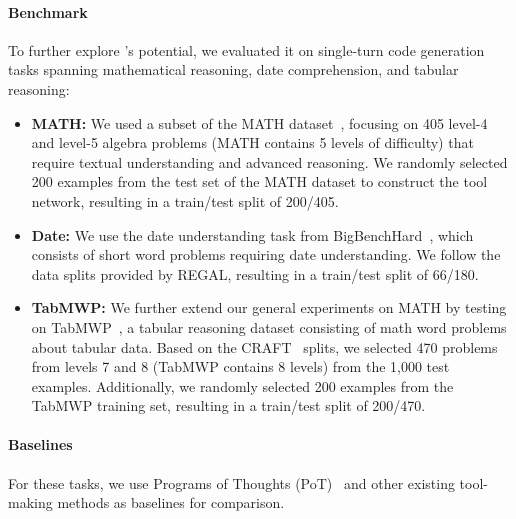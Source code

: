 \paragraph{Benchmark}
To further explore {\ours}'s potential, we evaluated it on single-turn code generation tasks spanning mathematical reasoning, date comprehension, and tabular reasoning:
 \begin{itemize}
     \item \textbf{MATH:} We used a subset of the MATH dataset~\citep{hendrycks2021measuring}, focusing on 405 level-4 and level-5 algebra problems (MATH contains 5 levels of difficulty) that require textual understanding and advanced reasoning. We randomly selected 200 examples from the test set of the MATH dataset to construct the tool network, resulting in a train/test split of 200/405.
     \item \textbf{Date:} We use the date understanding task from BigBenchHard~\citep{srivastava2022beyond}, which consists of short word problems requiring date understanding. We follow the data splits provided by REGAL\citep{stengel2024regal}, resulting in a train/test split of 66/180.
     \item \textbf{TabMWP:} We further extend our general experiments on MATH by testing on TabMWP~\citep{grand2023learning}, a tabular reasoning dataset consisting of math word problems about tabular data. Based on the CRAFT~\citep{yuan2023craft} splits, we selected 470 problems from levels 7 and 8 (TabMWP contains 8 levels) from the 1,000 test examples. Additionally, we randomly selected 200 examples from the TabMWP training set, resulting in a train/test split of 200/470.
\end{itemize}

\paragraph{Baselines}
For these tasks, we use Programs of Thoughts (PoT)~\citep{chen2022program} and other existing tool-making methods as baselines for comparison.

